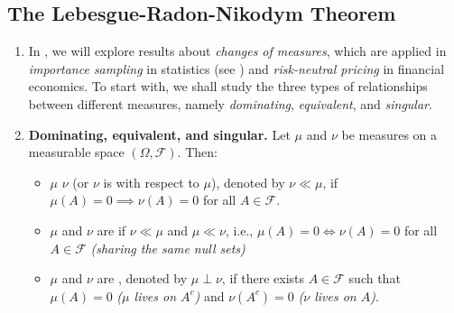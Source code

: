 \subsection{The Lebesgue-Radon-Nikodym Theorem}
\label{subsect:leb-rn}
\begin{enumerate}
\item In , we will explore results about \emph{changes of
measures}, which are applied in \emph{importance sampling} in statistics (see
) and \emph{risk-neutral pricing} in financial
economics. To start with, we shall study the three types of relationships
between different measures, namely \emph{dominating}, \emph{equivalent}, and
\emph{singular}.
\item \textbf{Dominating, equivalent, and singular.} Let \(\mu\) and \(\nu\) be
measures on a measurable space \((\Omega,\mathcal{F})\). Then:
\begin{itemize}
\item \(\mu\)  \(\nu\) (or \(\nu\) is  with respect to \(\mu\)), denoted by \(\nu\ll\mu\), if
\(\mu(A)=0\implies \nu(A)=0\) for all \(A\in\mathcal{F}\).
\item \(\mu\) and \(\nu\) are  if \(\nu\ll\mu\) and
\(\mu\ll\nu\), i.e., \(\mu(A)=0\iff \nu(A)=0\) for all \(A\in\mathcal{F}\)
\emph{(sharing the same null sets)}
\item \(\mu\) and \(\nu\) are , denoted by \(\mu\perp\nu\), if
there exists \(A\in\mathcal{F}\) such that \(\mu(A)=0\) \emph{(\(\mu\) lives on
\(A^{c}\))} and \(\nu(A^{c})=0\) \emph{(\(\nu\) lives on \(A\))}.


\end{itemize}
\end{enumerate}
